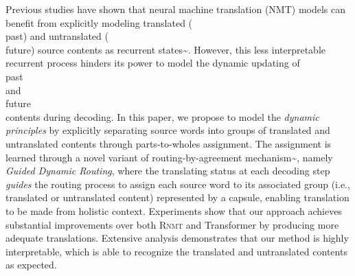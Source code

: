 Previous studies have shown that neural machine translation (NMT) models can benefit from explicitly modeling translated (\\past) and untranslated (\\future) source contents as recurrent states{\textasciitilde}\cite{zheng2018modeling}. 
However, this less interpretable recurrent process hinders its power to model the dynamic updating of \\past\\ and \\future\\ contents during decoding.
In this paper, we propose to model the \textit{dynamic principles} by explicitly separating source words into groups of translated and untranslated contents through parts-to-wholes assignment.
The assignment is learned through a novel variant of routing-by-agreement mechanism{\textasciitilde}\cite{sabour2017dynamic}, namely {\em Guided Dynamic Routing}, where the translating status at each decoding step \textit{guides} the routing process to assign each source word to its associated group (i.e., translated or untranslated content)  represented by a capsule, enabling translation to be made from holistic context.
Experiments show that our approach achieves substantial improvements over both \textsc{Rnmt} and Transformer by producing more adequate translations. Extensive analysis demonstrates that our method is highly interpretable, which is able to recognize the translated and untranslated contents as expected.